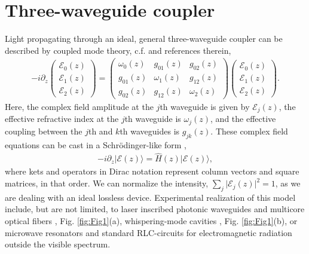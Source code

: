 \documentclass[9pt,twocolumn,twoside]{osajnl}
\begin{document}
\section{Three-waveguide coupler}

Light propagating through an ideal, general three-waveguide coupler can be described by coupled mode theory, c.f. \cite{RodriguezLara2015p068014} and references therein,
\begin{eqnarray}\label{eq:principal}
-i \partial_{z} \left( \begin{array}{c} \mathcal{E}_{0}(z) \\ \mathcal{E}_{1}(z) \\  \mathcal{E}_{2}(z) \end{array} \right) =  \left( \begin{array}{ccc} 
\omega_{0}(z)  & g_{01}(z) & g_{02}(z) \\
g_{01}(z) & \omega_{1}(z) & g_{12}(z) \\
g_{02}(z) & g_{12}(z) & \omega_{2}(z)
\end{array} \right) \left( \begin{array}{c} \mathcal{E}_{0}(z) \\ \mathcal{E}_{1}(z) \\  \mathcal{E}_{2}(z) \end{array} \right).
\end{eqnarray}
Here, the complex field amplitude at the $j$th waveguide is given by $\mathcal{E}_{j}(z)$, the effective refractive index at the $j$th waveguide is $\omega_{j}(z)$, and the effective coupling between the $j$th and $k$th waveguides is $g_{jk}(z)$.
These complex field equations can be cast in a Schr\"odinger-like form \cite{RodriguezLara2015p068014},
\begin{eqnarray}
- i \partial_{z} \vert \mathcal{E}(z) \rangle = \hat{H}(z) \vert \mathcal{E}(z) \rangle,\label{eq:diff}
\end{eqnarray}
where kets and operators in Dirac notation represent column vectors and square matrices, in that order.
We can normalize the intensity, $\sum_{j} \vert \mathcal{E}_{j}(z) \vert^2 =1$, as we are dealing with an ideal lossless device.
Experimental realization of this model include, but are not limited, to laser inscribed photonic waveguides \cite{Szameit2010p163001} and  multicore optical fibers \cite{}, Fig. \ref{fig:Fig1}(a), whispering-mode cavities \cite{}, Fig. \ref{fig:Fig1}(b), or microwave resonators \cite{FrancoVillafane2013p170405} and standard RLC-circuits \cite{} for electromagnetic radiation outside the visible spectrum.
\end{document}
